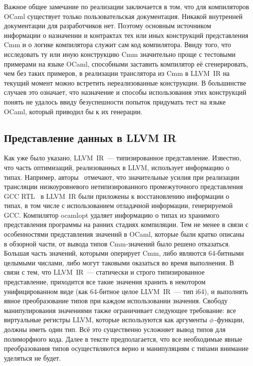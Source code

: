 \documentclass[a4paper, 12pt]{article}
\begin{document}
Важное общее замечание по реализации заключается в том, что для компиляторов OCaml существует только пользовательская
документация. Никакой внутренней документации для разработчиков нет. Поэтому основным источником информации о
назначении и контрактах тех или иных конструкций представления Cmm и о логике компилятора служит сам код компилятора.
Ввиду того, что исследовать ту или иную конструкцию Cmm значительно проще с тестовыми примерами на языке OCaml,
способными заставить компилятор её сгенерировать, чем без таких примеров, в реализации транслятора из Cmm
в LLVM~IR на текущий момент можно встретить нереализованные конструкции. В большинстве случаев это означает, что
назначение и способы использования этих конструкций понять не удалось ввиду безуспешности попыток придумать тест на
языке OCaml, который приводил бы к их генерации.

\subsection{Представление данных в LLVM IR}
Как уже было указано, LLVM~IR~--- типизированное представление. Известно, что часть оптимизаций, реализованных в LLVM,
использует информацию о типах. Например, авторы~\cite{LLVM} отмечают, что значительные усилия при реализации
трансляции низкоуровневого нетипизированного промежуточного представления GCC RTL~\cite{GCCints} в LLVM~IR были
приложены к восстановлению информации о
типах, в том числе с использованием отладачной информации, генерируемой GCC. Компилятор ocamlopt удаляет информацию о
типах из хранимого представления программы на ранних стадиях компиляции. Тем не менее в связи с особенностями
представления значений в OCaml, которые были кратко описаны в обзорной части, от вывода типов Cmm-значений было решено
отказаться. Большая часть значений, которыми оперирует Cmm, либо являются 64-битными целымыми числами, либо могут
таковыми оказаться во время выполнения. В связи с тем, что LLVM~IR~--- статически и строго типизированное представление,
приходится все такие значения хранить в некотором унифицированном виде (как 64-битное целое LLVM~IR~--- тип i64), и
выполнять явное преобразование типов при каждом использовании значения. Свободу манипулирования значениями также
ограничивает следующее требование: все виртуальные регистры LLVM, которые используются как аргументы $\phi\,$-функции,
должны иметь один тип. Всё это существенно усложняет вывод типов для полиморфного кода. Далее в тексте предполагается,
что все необходимые явные преобразования типов осуществляются верно и манипуляциям с типами внимание уделяться не будет.
\end{document}
